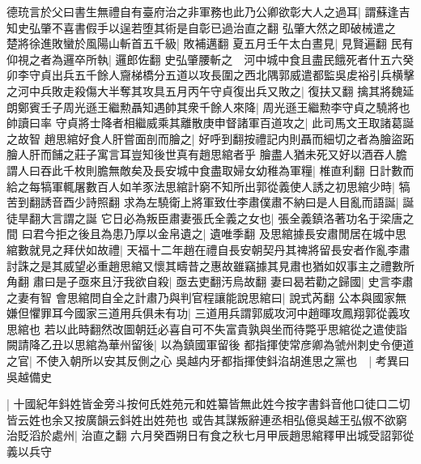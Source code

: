 德珫言於父曰書生無禮自有臺府治之非軍務也此乃公卿欲彰大人之過耳|{
	謂蘇逢吉知史弘肇不喜書假手以逞若堕其術是自彰已過治直之翻}
弘肇大然之即破械遣之　楚將徐進敗蠻於風陽山斬首五千級|{
	敗補邁翻}
夏五月壬午太白晝見|{
	見賢遍翻}
民有仰視之者為邏卒所執|{
	邏郎佐翻}
史弘肇腰斬之　河中城中食且盡民餓死者什五六癸卯李守貞出兵五千餘人齎梯橋分五道以攻長圍之西北隅郭威遣都監吳䖍裕引兵横擊之河中兵敗走殺傷大半奪其攻具五月丙午守貞復出兵又敗之|{
	復扶又翻}
擒其將魏延朗鄭賓壬子周光遜王繼勲聶知遇帥其衆千餘人來降|{
	周光遜王繼勲李守貞之驍將也帥讀曰率}
守貞將士降者相繼威乘其離散庚申督諸軍百道攻之|{
	此司馬文王取諸葛誕之故智}
趙思綰好食人肝嘗面剖而膾之|{
	好呼到翻按禮記内則聶而細切之者為膾盜跖膾人肝而餔之莊子寓言耳豈知後世真有趙思綰者乎}
膾盡人猶未死又好以酒吞人膽謂人曰吞此千枚則膽無敵矣及長安城中食盡取婦女幼稚為軍糧|{
	椎直利翻}
日計數而給之每犒軍輒屠數百人如羊豕法思綰計窮不知所出郭從義使人誘之初思綰少時|{
	犒苦到翻誘音酉少詩照翻}
求為左驍衛上將軍致仕李肅僕肅不納曰是人目亂而語誕|{
	誕徒旱翻大言謂之誕}
它日必為叛臣肅妻張氏全義之女也|{
	張全義鎮洛著功名于梁唐之間}
曰君今拒之後且為患乃厚以金帛遺之|{
	遺唯季翻}
及思綰據長安肅閒居在城中思綰數就見之拜伏如故禮|{
	天福十二年趙在禮自長安朝契丹其禆將留長安者作亂李肅討誅之是其威望必重趙思綰又懷其疇昔之惠故雖竊據其見肅也猶如奴事主之禮數所角翻}
肅曰是子亟來且汙我欲自殺|{
	亟去吏翻汚烏故翻}
妻曰曷若勸之歸國|{
	史言李肅之妻有智}
會思綰問自全之計肅乃與判官程讓能說思綰曰|{
	說式芮翻}
公本與國家無嫌但懼罪耳今國家三道用兵俱未有功|{
	三道用兵謂郭威攻河中趙暉攻鳳翔郭從義攻思綰也}
若以此時翻然改圖朝廷必喜自可不失富貴孰與坐而待斃乎思綰從之遣使詣闕請降乙丑以思綰為華州留後|{
	以為鎮國軍留後}
都指揮使常彦卿為虢州刺史令便道之官|{
	不使入朝所以安其反側之心}
吳越内牙都指揮使鈄淊胡進思之黨也　|{
	考異曰吳越備史}


|{
	十國紀年鈄姓皆金旁斗按何氏姓苑元和姓纂皆無此姓今按字書鈄音他口徒口二切皆云姓也余又按廣韻云鈄姓出姓苑也}
或告其謀叛辭連丞相弘億吳越王弘俶不欲窮治貶滔於處州|{
	治直之翻}
六月癸酉朔日有食之秋七月甲辰趙思綰釋甲出城受詔郭從義以兵守

